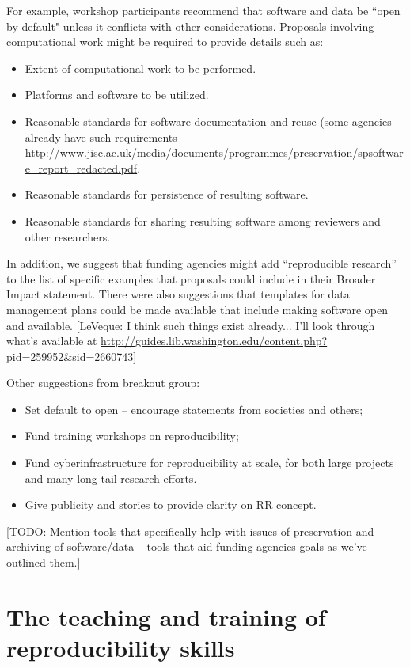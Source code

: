\documentclass[11pt]{article}
\newcommand{\todo}[1]{{\color{red} [TODO: #1]}}
\newcommand{\comment}[1]{{\color{blue} [#1]}}
\newcommand{\todo}[1]{}
\newcommand{\comment}[1]{}
\begin{document}
For example, workshop participants recommend that software and data be ``open
by default" unless it conflicts with other considerations. 
Proposals involving computational work might
be required to provide details such as:

\begin{itemize} 
\item Extent of computational work to be performed.
\item Platforms and software to be utilized.
\item Reasonable standards for software documentation and reuse (some agencies
already have such requirements 
\url{http://www.jisc.ac.uk/media/documents/programmes/preservation/spsoftware_report_redacted.pdf}.
\item Reasonable standards for persistence of resulting software.
\item Reasonable standards for sharing resulting software among reviewers and
other researchers.
\end{itemize} 


In addition, we suggest that funding
agencies might add ``reproducible research'' to the list of specific examples
that proposals could include in their Broader Impact statement. There were
also suggestions that templates for data management plans could be made
available that include making software open and available.
\comment{LeVeque: I think such things exist already... I'll look through
what's available at
\url{http://guides.lib.washington.edu/content.php?pid=259952&sid=2660743}}

Other suggestions from breakout group: 
\begin{itemize} 
\item    Set default to open – encourage statements from societies
and others;
\item    Fund training workshops on reproducibility;
\item    Fund cyberinfrastructure for reproducibility at scale, for
both large projects and many long-tail research efforts.
\item    Give publicity and stories to provide clarity on RR concept.
\end{itemize} 


\todo{ Mention tools that specifically help with issues of preservation and
archiving of software/data – tools that aid funding agencies goals as we’ve
outlined them.}

\section{The teaching and training of reproducibility skills}
\label{sec:teaching}
\end{document}
